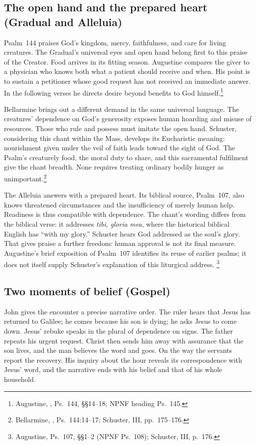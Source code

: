 \subsection{The open hand and the prepared heart (Gradual and Alleluia)}
Psalm~144 praises God's kingdom, mercy, faithfulness, and care for living
creatures. The Gradual's universal eyes and open hand belong first to
this praise of the Creator. Food arrives in its fitting season. Augustine
compares the giver to a physician who knows both what a patient should
receive and when. His point is to sustain a petitioner whose good request
has not received an immediate answer. In the following verses he directs
desire beyond benefits to God himself.\footnote{Augustine, , Ps.~144, \S\S14--18; NPNF heading Ps.~145.}

Bellarmine brings out a different demand in the same universal language.
The creatures' dependence on God's generosity exposes human hoarding and
misuse of resources. Those who rule and possess must imitate the open hand.
Schuster, considering this chant within the Mass, develops its Eucharistic
meaning: nourishment given under the veil of faith leads toward the sight
of God. The Psalm's creaturely food, the moral duty to share, and this
sacramental fulfilment give the chant breadth. None requires treating
ordinary bodily hunger as unimportant.\footnote{Bellarmine, , Ps.~144:14--17; Schuster, III, pp.~175--176.}

The Alleluia answers with a prepared heart. Its biblical source, Psalm~107,
also knows threatened circumstances and the insufficiency of merely human
help. Readiness is thus compatible with dependence. The chant's wording
differs from the biblical verse: it addresses \emph{tibi, gloria mea},
where the historical biblical English has ``with my glory.'' Schuster
hears God addressed as the soul's glory. That gives praise a further
freedom: human approval is not its final measure. Augustine's brief
exposition of Psalm~107 identifies its reuse of earlier psalms; it does
not itself supply Schuster's explanation of this liturgical address.
\footnote{Augustine, Ps.~107, \S\S1--2 (NPNF Ps.~108); Schuster, III, p.~176.}

\subsection{Two moments of belief (Gospel)}
John gives the encounter a precise narrative order. The ruler hears that
Jesus has returned to Galilee; he comes because his son is dying; he asks
Jesus to come down. Jesus' rebuke speaks in the plural of dependence on
signs. The father repeats his urgent request. Christ then sends him away
with assurance that the son lives, and the man believes the word and goes.
On the way the servants report the recovery. His inquiry about the hour
reveals its correspondence with Jesus' word, and the narrative ends with
his belief and that of his whole household.

